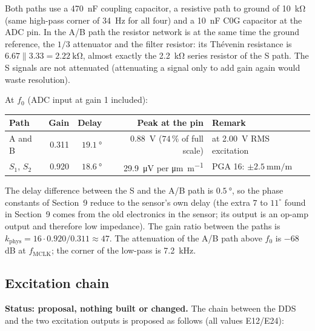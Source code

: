 \documentclass[11pt,a4paper]{article}
\begin{document}
Both paths use a \SI{470}{\nano\farad} coupling capacitor, a resistive path to ground
of \SI{10}{\kilo\ohm} (same high-pass corner of \SI{34}{\hertz} for all four) and a
\SI{10}{\nano\farad} C0G capacitor at the ADC pin.  In the A/B path the resistor network
is at the same time the ground reference, the $1/3$ attenuator and the filter
resistor: its Th\'evenin resistance is $6.67\parallel3.33=\SI{2.22}{\kilo\ohm}$, almost
exactly the \SI{2.2}{\kilo\ohm} series resistor of the S path.  The S signals are not
attenuated (attenuating a signal only to add gain again would waste resolution).

At $f_0$ (ADC input at gain 1 included):
\begin{center}
\small
\begin{tabular}{@{}lrrrl@{}}
\toprule
Path & Gain & Delay & Peak at the pin & Remark \\
\midrule
A and B & 0.311 & $\SI{19.1}{\degree}$ & \SI{0.88}{\volt} ($74\,\%$ of full scale) & at \SI{2.00}{\volt} RMS excitation \\
$S_1$, $S_2$ & 0.920 & $\SI{18.6}{\degree}$ & \SI{29.9}{\micro\volt} per \si{\micro\metre\per\metre} & PGA 16: $\pm\SI{2.5}{\milli\metre\per\metre}$ \\
\bottomrule
\end{tabular}
\end{center}
The delay difference between the S and the A/B path is $\SI{0.5}{\degree}$, so the
phase constants of Section~9 reduce to the sensor's own delay (the extra
$7$ to $11^{\circ}$ found in Section~9 comes from the old electronics in the sensor;
its output is an op-amp output and therefore low impedance).  The gain ratio between the
paths is $k_{\mathrm{phys}}=16\cdot0.920/0.311\approx47$.  The attenuation of the A/B path
above $f_0$ is $-68$\,dB at $f_{\mathrm{MCLK}}$; the corner of the low-pass is \SI{7.2}{\kilo\hertz}.

\subsection{Excitation chain}

\textbf{Status: proposal, nothing built or changed.}  The chain between the DDS and the two
excitation outputs is proposed as follows (all values E12/E24):
\end{document}
